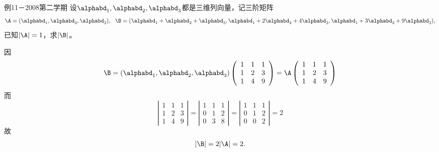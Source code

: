 \begin{frame}
  \begin{footnotesize}
    \begin{exampleblock}{例11－2008第二学期}
      设$\alphabd_1,\alphabd_2,\alphabd_3$都是三维列向量，记三阶矩阵
      $$
      \A=(\alphabd_1,\alphabd_2,\alphabd_3),~~
      \B=(\alphabd_1+\alphabd_2+\alphabd_3,\alphabd_1+2\alphabd_2+4\alphabd_3,\alphabd_1+3\alphabd_2+9\alphabd_3),
      $$已知$|\A|=1$，求$|\B|$。
    \end{exampleblock}
    \pause\jiename
    因
    $$
    \B=(\alphabd_1,\alphabd_2,\alphabd_3)\left(
    \begin{array}{ccc}
      1&1&1\\
      1&2&3\\
      1&4&9
    \end{array}
    \right)=\A\left(
    \begin{array}{ccc}
      1&1&1\\
      1&2&3\\
      1&4&9
    \end{array}
    \right)
    $$
    而
    $$
    \left|
    \begin{array}{ccc}
      1&1&1\\
      1&2&3\\
      1&4&9
    \end{array}
    \right|=\left|
    \begin{array}{ccc}
      1&1&1\\
      0&1&2\\
      0&3&8
    \end{array}
    \right|=\left|
    \begin{array}{ccc}
      1&1&1\\
      0&1&2\\
      0&0&2
    \end{array}
    \right|=2    
    $$
    故$$|\B|=2|\A|=2.$$
  \end{footnotesize}
\end{frame}


